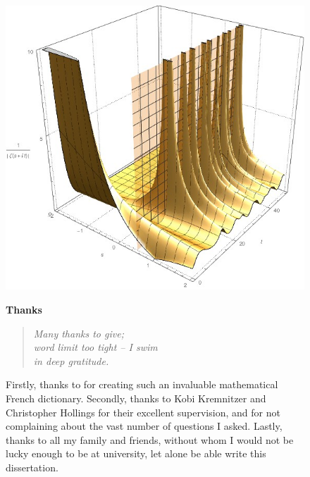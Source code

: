     \begin{figure}[h!]
        \centering
        \begin{minipage}[t]{0.45\textwidth}
            \vspace{0pt}
            \includegraphics[width=\textwidth]{images/riemann-zeta.jpg}
        \end{minipage}
        \hfill
        \begin{minipage}[t]{0.53\textwidth}
            \vspace{0pt}
            \footnotesize
            \centering\textbf{Thanks}\\[.7em]
            \raggedright
            \begin{verse}
                \emph{Many thanks to give;}\\
                \emph{word limit too tight -- I swim}\\
                \emph{in deep gratitude.}
            \end{verse}
            Firstly, thanks to \cite{Lan:2012tj} for creating such an invaluable mathematical French dictionary.
            Secondly, thanks to Kobi Kremnitzer and Christopher Hollings for their excellent supervision, and for not complaining about the vast number of questions I asked.
            Lastly, thanks to all my family and friends, without whom I would not be lucky enough to be at university, let alone be able write this dissertation.
        \end{minipage}
    \end{figure}

